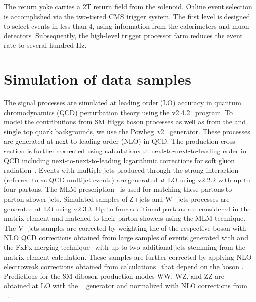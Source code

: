 %                                                                                                                                                                                                    
The return yoke carries a 2\unit{T} return field from the solenoid.
%                                                                                                                                                                                                    
Online event selection is accomplished via the two-tiered CMS trigger
system. The first level is designed to select events in less than
4\mus, using information from the calorimeters and muon detectors.
%                                                                                                                                                                                                    
Subsequently, the high-level trigger processor farm reduces the event rate to several hundred Hz.


\section{Simulation of data samples}

The signal processes are simulated at leading order (LO) accuracy in quantum chromodynamics (QCD) perturbation theory using the  v2.4.2~\cite{amcatnlo} program.
%
To model the contributions from SM Higgs boson processes as well as
from the \ttbar and single top quark backgrounds, we use the {\sc Powheg~v2}~\cite{Nason:2004rx,Frixione:2007vw,Alioli:2010xd} generator. These processes are generated at next-to-leading order (NLO) in QCD. The \ttbar production 
cross section is further corrected using calculations at 
next-to-next-to-leading order in QCD including next-to-next-to-leading 
logarithmic corrections for soft gluon radiation~\cite{ttbarNNLO}. 
% 
Events with multiple jets produced through the strong interaction (referred to as QCD multijet events) are generated at LO using  v2.2.2 with up to four partons. The MLM prescription~\cite{mlm} is used for matching these partons to parton shower jets.
%
Simulated samples of Z+jets and W+jets processes are generated at LO using  v2.3.3. Up to four additional partons are considered in the matrix element and matched to their parton showers using the MLM technique.
%
The V+jets samples are corrected by weighting the \pt of the respective boson with NLO QCD corrections obtained from large samples of events generated with  and the FxFx merging technique~\cite{fxfx} with up to two additional jets stemming from the matrix element calculation.
%
These samples are further corrected by applying NLO electroweak corrections obtained from calculations~\cite{Kuhn:2005gv,Kallweit:2015fta,Kallweit:2015dum} that depend on the boson \pt.
%
Predictions for the SM diboson production modes WW, WZ, and ZZ are obtained at LO with the {\sc {}}~\cite{Sjostrand:2014zea} generator and normalized with NLO corrections from \MCFM~\cite{MCFM}. 
%


